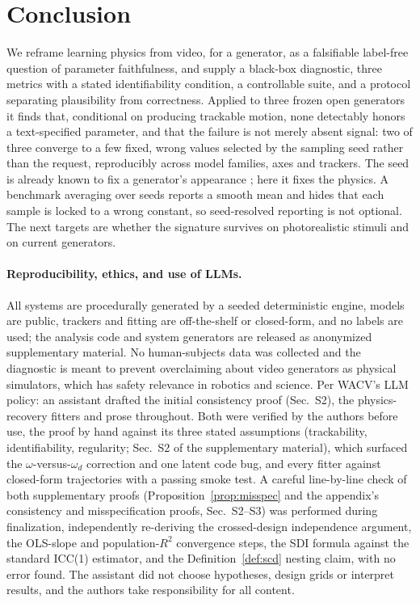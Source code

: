 \documentclass[10pt,twocolumn,letterpaper]{article}
\begin{document}
\section{Conclusion}
\label{sec:conclusion}
We reframe learning physics from video, for a generator, as a falsifiable
label-free question of parameter faithfulness, and supply a black-box
diagnostic, three metrics with a stated identifiability condition, a
controllable suite, and a protocol separating plausibility from correctness.
Applied to three frozen open generators it finds that, conditional on
producing trackable motion, none detectably honors a text-specified
parameter, and that the failure is not merely absent signal: two of three
converge to a few fixed, wrong values selected by the sampling seed rather
than the request, reproducibly across model families, axes and trackers. The
seed is already known to fix a generator's appearance \citep{xu2025goodseed};
here it fixes the physics. A benchmark averaging over seeds reports a smooth
mean and hides that each sample is locked to a wrong constant, so
seed-resolved reporting is not optional. The next targets are whether the
signature survives on photorealistic stimuli and on current generators.

\paragraph{Reproducibility, ethics, and use of LLMs.}
All systems are procedurally generated by a seeded deterministic engine,
models are public, trackers and fitting are off-the-shelf or closed-form, and
no labels are used; the analysis code and system generators are released as
anonymized supplementary material. No human-subjects data was
collected and the diagnostic is meant to prevent overclaiming about video
generators as physical simulators, which has safety relevance in robotics and
science. Per WACV's LLM policy: an assistant drafted the initial consistency
proof (Sec.~S2), the physics-recovery fitters and prose throughout. Both were
verified by the authors before use, the proof by hand against its three
stated assumptions (trackability, identifiability, regularity; Sec.~S2 of
the supplementary material), which surfaced the $\omega$-versus-$\omega_d$
correction and one latent code bug, and every fitter against closed-form
trajectories with a passing smoke test. A careful line-by-line check of
both supplementary proofs (Proposition~\ref{prop:misspec} and the
appendix's consistency and misspecification proofs, Sec.~S2--S3) was
performed during finalization, independently re-deriving the crossed-design
independence argument, the OLS-slope and population-$R^2$ convergence
steps, the SDI formula against the standard ICC(1) estimator, and the
Definition~\ref{def:scd} nesting claim, with no error found. The assistant
did not choose hypotheses, design grids or interpret results, and the
authors take responsibility for all content.

{
    \small
    
    
}
\end{document}
